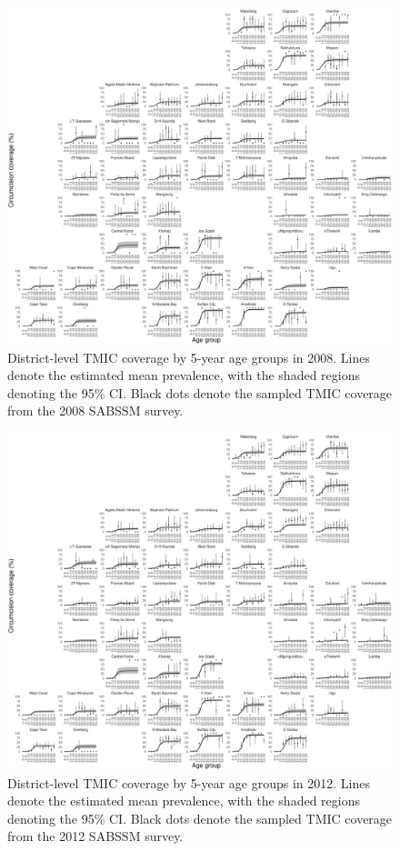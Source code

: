 \documentclass{article}
\begin{document}
\begin{appendix}
\begin{figure}[H]
	\centering
	\includegraphics[width = \linewidth]{Figures/suppmat/ModelFit/TMICPrev_5year_District_2008_withsurveypoints}
	\caption{District-level TMIC coverage by 5-year age groups in 2008. Lines denote the estimated mean prevalence, with the shaded regions denoting the 95\% CI. Black dots denote the sampled TMIC coverage from the 2008 SABSSM survey.}
\end{figure}


\begin{figure}[H]
	\centering
	\includegraphics[width = \linewidth]{Figures/suppmat/ModelFit/TMICPrev_5year_District_2012_withsurveypoints}
	\caption{District-level TMIC coverage by 5-year age groups in 2012. Lines denote the estimated mean prevalence, with the shaded regions denoting the 95\% CI. Black dots denote the sampled TMIC coverage from the 2012 SABSSM survey.}
\end{figure}


\end{appendix}
\end{document}
